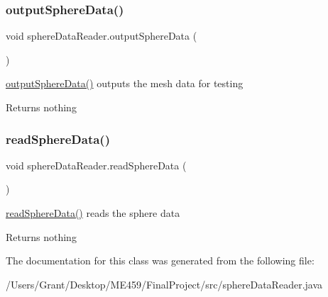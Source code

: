\subsubsection{\texorpdfstring{output\+Sphere\+Data()}{outputSphereData()}}
{\footnotesize\ttfamily void sphere\+Data\+Reader.\+output\+Sphere\+Data (\begin{DoxyParamCaption}{ }\end{DoxyParamCaption})\hspace{0.3cm}{\ttfamily [protected]}}

\mbox{\hyperlink{classsphere_data_reader_a3b78bf5848527d779cb01d6daf1afc14}{output\+Sphere\+Data()}} outputs the mesh data for testing \begin{DoxyReturn}{Returns}
nothing 
\end{DoxyReturn}
\mbox{\label{classsphere_data_reader_a559764e786b75f333970ee36433011f0}} 
\subsubsection{\texorpdfstring{read\+Sphere\+Data()}{readSphereData()}}
{\footnotesize\ttfamily void sphere\+Data\+Reader.\+read\+Sphere\+Data (\begin{DoxyParamCaption}{ }\end{DoxyParamCaption})\hspace{0.3cm}{\ttfamily [protected]}}

\mbox{\hyperlink{classsphere_data_reader_a559764e786b75f333970ee36433011f0}{read\+Sphere\+Data()}} reads the sphere data \begin{DoxyReturn}{Returns}
nothing 
\end{DoxyReturn}


The documentation for this class was generated from the following file\+:\begin{DoxyCompactItemize}
\item 
/\+Users/\+Grant/\+Desktop/\+M\+E459/\+Final\+Project/src/sphere\+Data\+Reader.\+java\end{DoxyCompactItemize}
